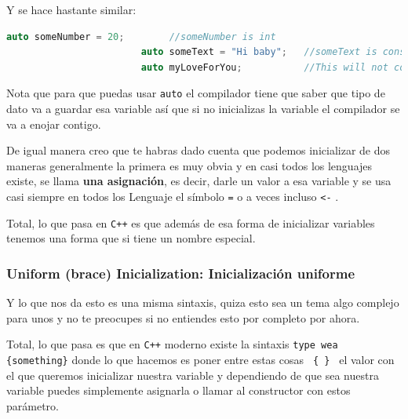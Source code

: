 \documentclass[12pt, fleqn]{report}                             %
\theoremstyle{break}                                            %
\newcommand{\textCode}[1]  { \texttt{#1} }                      %
\newcommand{\Cpp}{\ignorespaces\textCode{C++}}                  %
\begin{document}
                    Y se hace hastante similar:
                    \begin{lstlisting}[language=C++, gobble=24]
                        auto someNumber = 20;        //someNumber is int
                        auto someText = "Hi baby";   //someText is const char* (this is sad)
                        auto myLoveForYou;           //This will not compile :v
                    \end{lstlisting}

                    Nota que para que puedas usar \textCode{auto} el compilador tiene que saber que tipo
                    de dato va a guardar esa variable así que si no inicializas la variable 
                    el compilador se va a enojar contigo.

                    De igual manera creo que te habras dado cuenta que podemos inicializar de dos maneras
                    generalmente la primera es muy obvia y en casi todos los lenguajes existe, se llama
                    \textbf{una asignación}, es decir, darle un valor a esa variable y se usa casi siempre en
                    todos los Lenguaje el símbolo \textCode{=} o a veces incluso \textCode{<-}.

                    Total, lo que pasa en \Cpp es que además de esa forma de inicializar variables tenemos
                    una forma que si tiene un nombre especial.

                \subsubsection{Uniform (brace) Inicialization: Inicialización uniforme}

                    Y lo que nos da esto es una misma sintaxis, quiza esto sea un tema algo complejo
                    para unos y no te preocupes si no entiendes esto por completo por ahora.

                    Total, lo que pasa es que en \Cpp moderno existe la sintaxis 
                    \textCode{type wea \{something\}} donde lo que hacemos es poner entre estas cosas
                    \textCode{ \{ \} } el valor con el que queremos inicializar nuestra variable y dependiendo
                    de que sea nuestra variable puedes simplemente asignarla o llamar al constructor con estos
                    parámetro.
\end{document}
